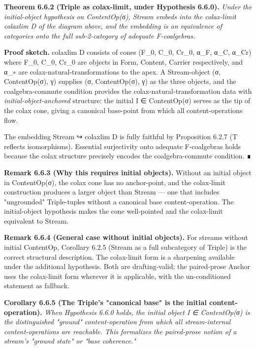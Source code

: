 \documentclass[11pt, openany]{book}
\begin{document}
\textbf{Theorem 6.6.2 (Triple as colax-limit, under Hypothesis 6.6.0).} \textit{Under the initial-object hypothesis on ContentOp(σ), Stream embeds into the colax-limit colaxlim D of the diagram above, and the embedding is an equivalence of categories onto the full sub-2-category of adequate F-coalgebras.}

\textbf{Proof sketch.} colaxlim D consists of cones (F\_\allowbreak{}0, C\_\allowbreak{}0, Cr\_\allowbreak{}0, α\_\allowbreak{}F, α\_\allowbreak{}C, α\_\allowbreak{}Cr) where F\_\allowbreak{}0, C\_\allowbreak{}0, Cr\_\allowbreak{}0 are objects in Form, Content, Carrier respectively, and α\_\allowbreak{}∗ are colax-natural-transformations to the apex. A Stream-object (σ, ContentOp(σ), γ) supplies (σ, ContentOp(σ), γ) as the three objects, and the coalgebra-commute condition provides the colax-natural-transformation data with \textit{initial-object-anchored} structure: the initial I ∈ ContentOp(σ) serves as the tip of the colax cone, giving a canonical base-point from which all content-operations flow.

The embedding Stream ↪ colaxlim D is fully faithful by Proposition 6.2.7 (T reflects isomorphisms). Essential surjectivity onto adequate F-coalgebras holds because the colax structure precisely encodes the coalgebra-commute condition. ∎

\textbf{Remark 6.6.3 (Why this requires initial objects).} Without an initial object in ContentOp(σ), the colax cone has no anchor-point, and the colax-limit construction produces a larger object than Stream --- one that includes "ungrounded" Triple-tuples without a canonical base content-operation. The initial-object hypothesis makes the cone well-pointed and the colax-limit equivalent to Stream.

\textbf{Remark 6.6.4 (General case without initial objects).} For streams without initial ContentOp, Corollary 6.2.5 (Stream as a full subcategory of Triple) is the correct structural description. The colax-limit form is a sharpening available under the additional hypothesis. Both are drafting-valid; the paired-prose Anchor uses the colax-limit form wherever it is applicable, with the un-conditioned statement as fallback.

\textbf{Corollary 6.6.5 (The Triple's "canonical base" is the initial content-operation).} \textit{When Hypothesis 6.6.0 holds, the initial object I ∈ ContentOp(σ) is the distinguished "ground" content-operation from which all stream-internal content-operations are reachable. This formalizes the paired-prose notion of a stream's "ground state" or "base coherence."}
\end{document}
